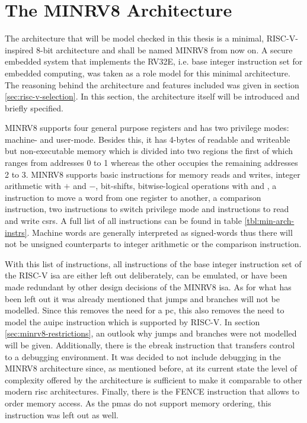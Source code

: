 \section{The MINRV8 Architecture}
\label{sec:minrv8}

The architecture that will be model checked in this thesis is a minimal, RISC-V-inspired 8-bit architecture and shall be named MINRV8 from now on.
A secure embedded system that implements the RV32E, i.e. base integer instruction set for embedded computing, was taken as a role model for this minimal architecture.
The reasoning behind the architecture and features included was given in section \ref{sec:risc-v-selection}.
In this section, the architecture itself will be introduced and briefly specified.

MINRV8 supports four general purpose registers and has two privilege modes: machine- and user-mode.
Besides this, it has 4-bytes of readable and writeable but non-executable memory which is divided into two regions the first of which ranges from addresses 0 to 1 whereas the other occupies the remaining addresses 2 to 3.
MINRV8 supports basic instructions for memory reads and writes, integer arithmetic with $ + $ and $ - $, bit-shifts, bitwise-logical operations with  and , a  instruction to move a word from one register to another, a comparison instruction, two instructions to switch privilege mode and instructions to read and write \glspl{csr}.
A full list of all instructions can be found in table \ref{tbl:min-arch-instrs}.
Machine words are generally interpreted as signed-words thus there will not be unsigned counterparts to integer arithmetic or the comparison instruction.

With this list of instructions, all instructions of the base integer instruction set of the RISC-V \gls{isa} are either left out deliberately, can be emulated, or have been made redundant by other design decisions of the MINRV8 \gls{isa}.
As for what has been left out it was already mentioned that jumps and branches will not be modelled.
Since this removes the need for a \gls{pc}, this also removes the need to model the \gls{auipc} instruction which is supported by RISC-V.
In section \ref{sec:minrv8-restrictions}, an outlook why jumps and branches were not modelled will be given.
Additionally, there is the \gls{ebreak} instruction that transfers control to a debugging environment.
It was decided to not include debugging in the MINRV8 architecture since, as mentioned before, at its current state the level of complexity offered by the architecture is sufficient to make it comparable to other modern \gls{risc} architectures.
Finally, there is the FENCE instruction that allows to order memory access.
As the \glspl{pma} do not support memory ordering, this instruction was left out as well.

